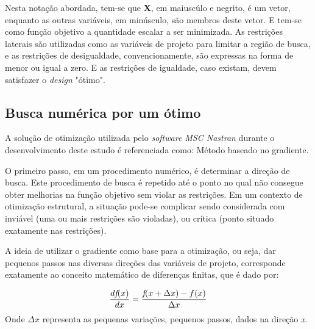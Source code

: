 Nesta notação abordada, tem-se que \textbf{X}, em maiuscúlo e negrito, é um vetor, enquanto as outras variáveis, em minúsculo, são membros deste vetor. E tem-se como função objetivo a quantidade escalar a ser minimizada. As restrições laterais são utilizadas como as variáveis de projeto para limitar a região de busca, e as restrições de desigualdade, convencionamente, são expressas na forma de menor ou igual a zero. E as restrições de igualdade, caso existam, devem satisfazer o \emph{design} "ótimo".

\subsection{Busca numérica por um ótimo}
A solução de otimização utilizada pelo \emph{software MSC Nastran} durante o desenvolvimento deste estudo é referenciada como: Método baseado no gradiente.

O primeiro passo, em um procedimento numérico, é determinar a direção de busca. Este procedimento de busca é repetido até o ponto no qual não consegue obter melhorias na função objetivo sem violar as restrições. Em um contexto de otimização estrutural, a situação pode-se complicar sendo considerada com inviável (uma ou mais restrições são violadas), ou crítica (ponto situado exatamente nas restrições).

A ideia de utilizar o gradiente como base para a otimização, ou seja, dar pequenos passos nas diversas direções das variáveis de projeto, corresponde exatamente ao conceito matemático de diferenças finitas, que é dado por:

\begin{equation} \label{otimization_5}
\frac{d\emph{f}(x)}{dx} = \dfrac{\emph{f}(x + \Delta x)-f(x)}{\Delta x}
\end{equation}
Onde ${\Delta x}$ representa as pequenas variações, pequenos passos, dados na direção \emph{x}.
